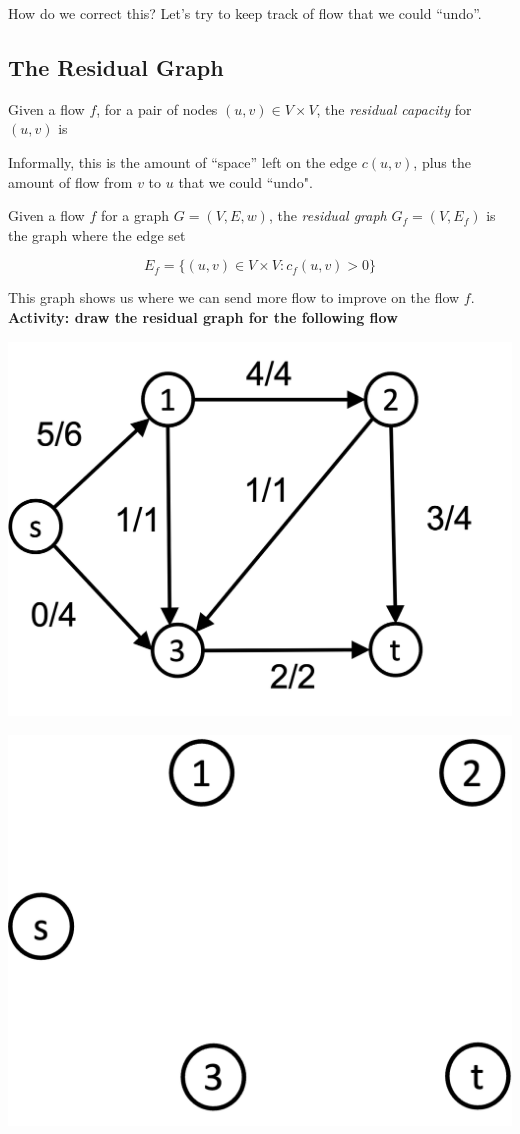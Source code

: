 \documentclass[11  pt]{article}
\begin{document}
	How do we correct this? Let's try to keep track of flow that we could ``undo''.
	
	\subsection{The Residual Graph}
	
	Given a flow $f$, for a pair of nodes $(u,v) \in V \times V$, the \emph{residual capacity} for $(u,v)$ is
	
	\vs{2cm}
	
	Informally, this is the amount of ``space'' left on the edge $c(u,v)$, plus the amount of flow from $v$ to $u$ that we could ``undo".
	
	\newpage
	Given a flow $f$ for a graph $G = (V,E,w)$, the \emph{residual graph} $G_f = (V, E_f)$ is the graph where the edge set 
	
	$$ E_f = \{(u,v) \in V \times V \colon c_f(u,v) > 0\}$$
	
	This graph shows us where we can send more flow to improve on the flow $f$.\\
	
	\textbf{Activity: draw the residual graph for the following flow}
	
	\vs{1cm}
	
	\includegraphics[width = .5\linewidth]{flow5.png} 
	
	\vs{2cm}
	
	
	
	\includegraphics[width = .6\linewidth]{flow4empty.png} 
	
\end{document}
